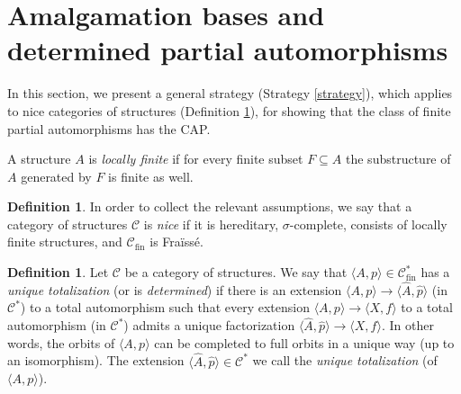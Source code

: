 \documentclass[10pt,a4paper]{article}
\theoremstyle{definition}
\newtheorem{df}[tw]{Definition}
\theoremstyle{remark}
\newcommand \seq [1]{\langle #1 \rangle}
\newcommand \C {\mathscr{C}}
\newcommand \fin {{\operatorname{fin}}}
\begin{document}
\color{black}





\section{Amalgamation bases and determined partial automorphisms}

In this section, we present a general strategy (Strategy \ref{strategy}), which applies to nice categories of structures (Definition \ref{nice}), for showing that the class of finite partial automorphisms has the CAP.






A structure $A$ is \emph{locally finite} if for every finite subset $F \subseteq A$ the substructure of $A$ generated by $F$ is finite as well.




\begin{df}\label{nice}
    In order to collect the relevant assumptions, we say that a category of structures $\C$ is \emph{nice} if it is hereditary, $\sigma$-complete, consists of locally finite structures, and $\C_\fin$ is Fraïssé.
\end{df}





\begin{df}
  Let $\C$ be a category of structures. 
    We say that $\seq{A, p} \in \C^*_\fin$ has a \emph{unique totalization} (or is \emph{determined}) if there is an extension $\seq{A, p} \to \seq{\hat{A}, \hat{p}}$ (in $\C^*$) to a total automorphism such that every extension $\seq{A, p} \to \seq{X, f}$ to a total automorphism (in $\C^*$) admits a unique factorization $\seq{\hat{A}, \hat{p}} \to \seq{X, f}$.
    In other words, the orbits of $\seq{A, p}$ can be completed to full orbits in a unique way (up to an isomorphism).
    The extension $\seq{\hat{A}, \hat{p}}\in \C^*$ we call the \emph{unique totalization} (of $\seq{A, p}$).
\end{df}
\end{document}
